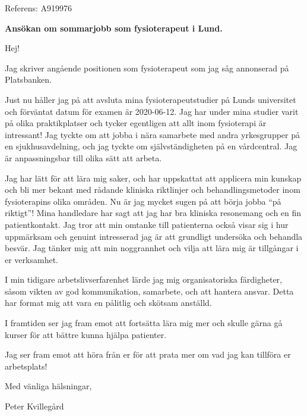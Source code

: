 \documentclass[10pt,a4paper]{letter}
\begin{document}
 
	\begin{letter}{Referens: A919976} 
		
\opening{\textbf{Ansökan om sommarjobb som fysioterapeut i Lund.}}
Hej!

Jag skriver angående positionen som fysioterapeut som jag såg annonserad på Platsbanken.

Just nu håller jag på att avsluta mina fysioterapeutstudier på Lunds universitet och förväntat \mbox{datum} för examen är 2020-06-12. Jag har under mina studier varit på olika praktikplatser och tycker egentligen att allt inom fysioterapi är intressant! Jag tyckte om att jobba i nära samarbete med andra yrkes\-grupper på en sjukhusavdelning, och jag tyckte om självständigheten på en vårdcentral. Jag är anpassningsbar till olika sätt att arbeta.

Jag har lätt för att lära mig saker, och har uppskattat att applicera min kunskap och bli mer bekant med rådande kliniska riktlinjer och behandlingsmetoder inom fysioterapins olika områden. Nu är jag mycket sugen på att börja jobba ``på riktigt''! Mina handledare har sagt att jag har bra kliniska resonemang och en fin patientkontakt. Jag tror att min omtanke till patienterna också visar sig i hur uppmärksam och genuint intresserad jag är att grundligt undersöka och behandla besvär. Jag tänker mig att min noggrannhet och vilja att lära mig är tillgångar i er verksamhet.

I min tidigare arbetslivserfarenhet lärde jag mig organisatoriska färdigheter, såsom vikten av god kommunikation, samarbete, och att hantera ansvar. Detta har format mig att vara en pålitlig och skötsam anställd.

I framtiden ser jag fram emot att fortsätta lära mig mer och skulle gärna gå kurser för att bättre kunna hjälpa patienter.

Jag ser fram emot att höra från er för att prata mer om vad jag kan tillföra er arbetsplats!
	
\vspace{1em}
\hspace{0.1\linewidth}Med vänliga hälsningar,

\hspace{0.1\linewidth}Peter Kvillegård
		 
 
\end{letter} 
\end{document}
